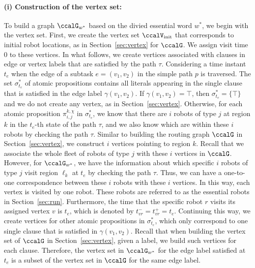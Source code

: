\documentclass[Afour,sageh,times]{sagej}
\renewcommand{\ap}[3]{\mathcal{\pi}_{{#1},{#2}}^{#3}}
\begin{document}
{{\paragraph{(i) Construction of the vertex set:}\label{app:vertex} To build a graph $\ccalG_{w^*}$ based on the divied  essential word  $w^*$, we begin with the vertex set. First, we create the vertex set $\ccalV_{\text{init}}$ that corresponds to initial robot locations, as in Section~\ref{sec:vertex} for $\ccalG$.
We assign visit time 0 to these vertices. In what follows, we create vertices associated with clauses in edge or vertex labels that are satisfied by the path $\tau$. Considering a time instant $t_e$ when the edge of a subtask  $e = (v_1, v_2)$ in the simple path $p$ is traversed. The set $\sigma_{t_e}^*$ of atomic propositions  contains all literals appearing in the single clause that is satisfied in the edge label $\gamma(v_1, v_2)$. If $\gamma(v_1, v_2) = \top$, then $\sigma_{t_e}^* = \{\top\}$ and we do not create any vertex, as in Section~\ref{sec:vertex}. Otherwise, for each atomic proposition $\ap{i}{j}{k,\chi}$ in $\sigma_{t_e}^*$, we know that there are $i$ robots of type $j$ at region $k$ in the $t_e$-th state of the path $\tau$, and we also know which are within these $i$ robots by checking the path $\tau$. Similar to building the routing graph $\ccalG$ in Section~\ref{sec:vertex}, we construct $i$ vertices pointing to region $k$. Recall that we associate the whole fleet of robots of type $j$ with these $i$ vertices in $\ccalG$. However, for $\ccalG_{w^*}$, we have the information about which specific $i$ robots of type $j$ visit region $\ell_k$ at $t_e$ by checking the path $\tau$. Thus, we can have a one-to-one correspondence between these $i$ robots with these $i$ vertices. In this way, each vertex is visited by one robot. These robots are referred to as the essential robots in Section~\ref{sec:run}. Furthermore, the time that the specific  robot $r$ visits its assigned vertex $v$ is $t_e$, which is denoted by $t_{vr}^- = t_{vr}^+ = t_e$. Continuing this way, we create vertices for other atomic propositions in $\sigma_{t_e}^*$, which only correspond to one single clause that is satisfied in $\gamma(v_1, v_2)$. Recall that when building the vertex set of $\ccalG$ in Section~\ref{sec:vertex}, given a label, we build such vertices for each clause. Therefore, the vertex set in $\ccalG_{w^*}$ for the edge label satisfied at $t_e$ is a subset of the vertex set in $\ccalG$ for the same edge label.

}}
\end{document}
